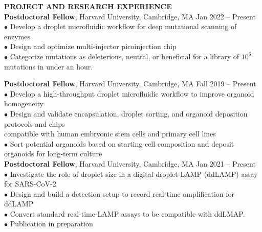\documentclass[10pt]{article}
\begin{document}
\textbf{\large PROJECT AND RESEARCH EXPERIENCE}\\
{\bf Postdoctoral Fellow}, Harvard University, Cambridge, MA \hfill Jan 2022 -- Present\\
\hspace*{10pt}$\bullet$ Develop a droplet microfluidic workflow for deep mutational scanning of enzymes\\
\hspace*{10pt}$\bullet$ Design and optimize multi-injector picoinjection chip \\
\hspace*{10pt}$\bullet$ Categorize mutations as deleterious, neutral, or beneficial for a library of $10^6$ mutations in under an hour.\\

\newpage

{\bf Postdoctoral Fellow}, Harvard University, Cambridge, MA \hfill Fall 2019 -- Present\\
\hspace*{10pt}$\bullet$ Develop a high-throughput droplet microfluidic workflow to improve organoid homogeneity\\
\hspace*{10pt}$\bullet$ Design and validate encapsulation, droplet sorting, and organoid deposition protocols and chips \\ \hspace*{15pt} compatible with human embryonic stem cells and primary cell lines\\
\hspace*{10pt}$\bullet$ Sort potential organoids based on starting cell composition and deposit organoids for long-term culture\\

{\bf Postdoctoral Fellow}, Harvard University, Cambridge, MA \hfill Jan 2021 -- Present\\
\hspace*{10pt}$\bullet$ Investigate the role of droplet size in a digital-droplet-LAMP (ddLAMP) assay for SARS-CoV-2\\
\hspace*{10pt}$\bullet$ Design and build a detection setup to record real-time amplification for ddLAMP\\
\hspace*{10pt}$\bullet$ Convert standard real-time-LAMP assays to be compatible with ddLMAP.\\
\hspace*{10pt}$\bullet$ Publication in preparation\\
\end{document}
